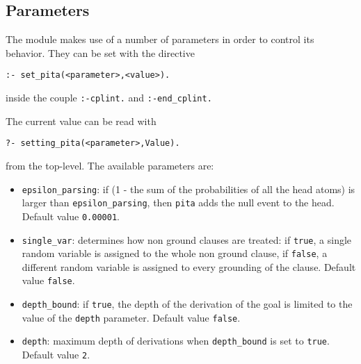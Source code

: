 \subsection{Parameters}
The module makes use of a number of parameters in order to control its behavior. They can be set with the directive
\begin{verbatim}
:- set_pita(<parameter>,<value>).
\end{verbatim}
inside the couple \texttt{:-cplint.} and \texttt{:-end\_cplint.} 

The current value can be read with
\begin{verbatim}
?- setting_pita(<parameter>,Value).
\end{verbatim}
from the top-level.
The available parameters are:
\begin{itemize}
\item 
	 \verb|epsilon_parsing|: if (1 - the sum of the probabilities of all the head atoms) is larger than 
    \verb|epsilon_parsing|,
		then \texttt{pita} adds the null event to the head. Default value \texttt{0.00001}.
\item \verb|single_var|: determines how non ground clauses are treated: if \texttt{true}, a single random variable is assigned to the whole non ground clause, 
if \texttt{false}, a different random variable is assigned to every grounding of the clause. Default value \texttt{false}.
\item \verb|depth_bound|: if \texttt{true}, the depth of the derivation of the goal is limited to the value of the \texttt{depth} parameter.  Default value \texttt{false}.
\item  \texttt{depth}: maximum depth of derivations when  \verb|depth_bound| is set to \texttt{true}. Default value \texttt{2}.
\end{itemize}

